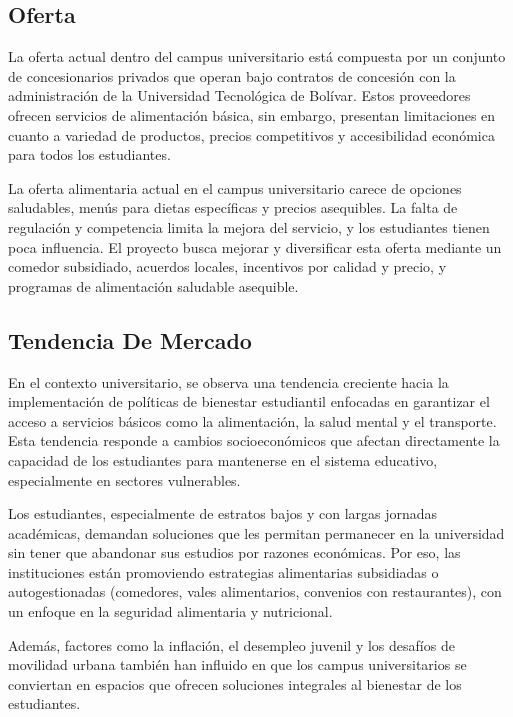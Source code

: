 \documentclass[letterpaper, 11pt]{report}
\begin{document}
\subsection{Oferta}

La oferta actual dentro del campus universitario está compuesta por un conjunto
de concesionarios privados que operan bajo contratos de concesión con la
administración de la Universidad Tecnológica de Bolívar. Estos proveedores
ofrecen servicios de alimentación básica, sin embargo, presentan limitaciones
en cuanto a variedad de productos, precios competitivos y accesibilidad
económica para todos los estudiantes.

La oferta alimentaria actual en el campus universitario carece de opciones
saludables, menús para dietas específicas y precios asequibles. La falta de
regulación y competencia limita la mejora del servicio, y los estudiantes
tienen poca influencia. El proyecto busca mejorar y diversificar esta oferta
mediante un comedor subsidiado, acuerdos locales, incentivos por calidad y
precio, y programas de alimentación saludable asequible.

\subsection{Tendencia De Mercado}

En el contexto universitario, se observa una tendencia creciente hacia la
implementación de políticas de bienestar estudiantil enfocadas en garantizar el
acceso a servicios básicos como la alimentación, la salud mental y el
transporte. Esta tendencia responde a cambios socioeconómicos que afectan
directamente la capacidad de los estudiantes para mantenerse en el sistema
educativo, especialmente en sectores vulnerables.

Los estudiantes, especialmente de estratos bajos y con largas jornadas
académicas, demandan soluciones que les permitan permanecer en la universidad
sin tener que abandonar sus estudios por razones económicas. Por eso, las
instituciones están promoviendo estrategias alimentarias subsidiadas o
autogestionadas (comedores, vales alimentarios, convenios con restaurantes),
con un enfoque en la seguridad alimentaria y nutricional.

Además, factores como la inflación, el desempleo juvenil y los desafíos de
movilidad urbana también han influido en que los campus universitarios se
conviertan en espacios que ofrecen soluciones integrales al bienestar de los
estudiantes.
\end{document}
